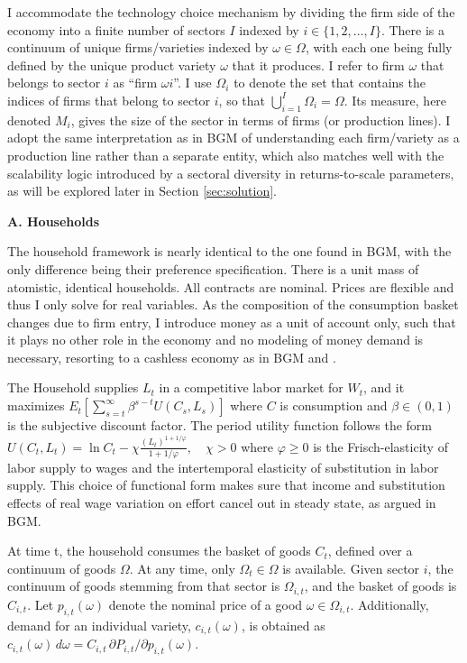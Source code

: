 \documentclass[a4paper,12pt]{article} %
\numberwithin{equation}{section} %
\numberwithin{figure}{section}
\numberwithin{table}{section}
\begin{document}
I accommodate the technology choice mechanism by dividing the firm side of the economy into a finite number of sectors $I$ indexed by
$i \in \{1,2,...,I\}$. There is a continuum of unique firms/varieties indexed by $\omega \in \Omega$, with each one being fully defined by 
the unique product variety $\omega$ that it produces. I refer to firm $\omega$ that belongs to sector $i$ as ``firm $\omega i$''. 
I use $\Omega_i$ to denote the set that contains the indices of firms that belong to sector $i$, so that $\bigcup_{i=1}^{I} \Omega_i = \Omega$. 
Its measure, here denoted $M_{i}$, gives the size of the sector in terms of firms (or production lines). I adopt the same interpretation as in BGM 
of understanding each firm/variety as a production line rather than a separate entity, which also matches well with the scalability logic introduced
by a sectoral diversity in returns-to-scale parameters, as will be explored later in Section \ref{sec:solution}.

\medskip
\medskip
\noindent\textbf{A. Households}
\medskip

The household framework is nearly identical to the one found in BGM, with the only difference being their preference specification. There is a 
unit mass of atomistic, identical households. All contracts are nominal. Prices are flexible and thus I only solve for real variables. As the
composition of the consumption basket changes due to firm entry, I introduce money as a unit of account only, such that it plays no other role in the
economy and no modeling of money demand is necessary, resorting to a cashless economy as in BGM and \textcite{woodford2003interest}.

The Household supplies $L_t$ in a competitive labor market for $W_t$, and it maximizes $E_t \left[ \sum_{s=t}^{\infty} \beta^{s - t} U(C_s, L_s) \right]$ 
where $C$ is consumption and $\beta \in (0,1)$ is the subjective discount factor. The period utility function follows the form 
$U(C_t, L_t) = \ln C_t - \chi \frac{(L_t)^{1 + 1/\varphi}}{1 + 1/\varphi}, \quad \chi > 0$ where $\varphi \geq 0$ is the Frisch-elasticity
of labor supply to wages and the intertemporal elasticity of substitution in labor supply. This choice of functional form makes sure that 
income and substitution effects of real wage variation on effort cancel out in steady state, as argued in BGM.

At time t, the household consumes the basket of goods $C_t$, defined over a continuum of goods $\Omega$. At any time, only $\Omega_t \in \Omega$ 
is available. Given sector $i$, the continuum of goods stemming from that sector is $\Omega_{i,t}$, and the basket of goods is $C_{i,t}$. 
Let $p_{i,t}(\omega)$ denote the nominal price 
of a good $\omega \in \Omega_{i,t}$. Additionally, demand for an individual variety, $c_{i,t}(\omega)$, is obtained as 
$c_{i,t}(\omega) \, d\omega = C_{i,t} \, \partial P_{i,t} / \partial p_{i,t}(\omega)$.
\end{document}
